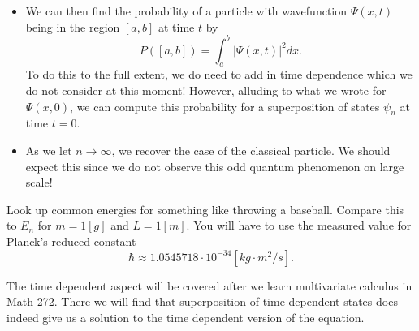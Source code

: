 \begin{itemize}
    \item We can then find the probability of a particle with wavefunction $\Psi(x,t)$ being in the region $[a,b]$ at time $t$ by
    \[
    P([a,b])=\int_a^b |\Psi(x,t)|^2dx.
    \]
    To do this to the full extent, we do need to add in time dependence which we do not consider at this moment! However, alluding to what we wrote for $\Psi(x,0)$, we can compute this probability for a superposition of states $\psi_n$ at time $t=0$.
    \item As we let $n\to \infty$, we recover the case of the classical particle.  We should expect this since we do not observe this odd quantum phenomenon on large scale!
\end{itemize}

\begin{exercise}
Look up common energies for something like throwing a baseball. Compare this to $E_n$ for $m=1[g]$ and $L=1[m]$. You will have to use the measured value for Planck's reduced constant
\[
\hbar \approx 1.0545718\cdot 10^{-34}[kg \cdot m^2 /s].
\]
\end{exercise}

\begin{remark}
    The time dependent aspect will be covered after we learn multivariate calculus in Math 272.  There we will find that superposition of time dependent states does indeed give us a solution to the time dependent version of the equation.  
\end{remark}


